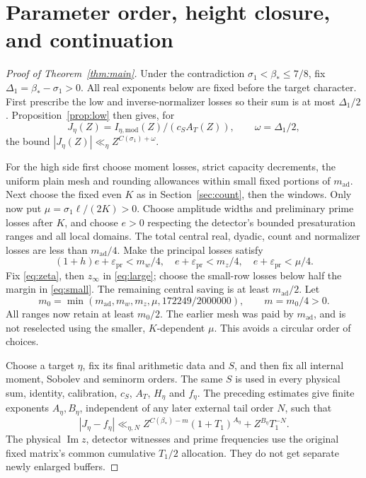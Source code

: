 \documentclass[11pt,a4paper]{article}
\theoremstyle{definition}
\newcommand{\Ima}{\operatorname{Im}}
\newcommand{\eps}{\varepsilon}
\newcommand{\sig}{\sigma_1}
\newcommand{\bet}{\beta_*}
\begin{document}
\section{Parameter order, height closure, and continuation}
\label{sec:closure}
\begin{proof}[Proof of Theorem~\ref{thm:main}]
Under the contradiction $\sig<\bet\le7/8$, fix
$\Delta_1=\bet-\sig>0$.
All real exponents below are fixed before the target character.
First prescribe the low and inverse-normalizer losses so their sum
is at most $\Delta_1/2$. Proposition~\ref{prop:low} then gives, for
\[
 J_\eta(Z)=I_{\eta,\mathrm{mod}}(Z)/(c_S A_T(Z)),
 \qquad \omega=\Delta_1/2,
\]
the bound $|J_\eta(Z)|\ll_\eta Z^{C(\sig)+\omega}$.

For the high side first choose moment losses, strict capacity
decrements, the uniform plain mesh and rounding allowances within
small fixed portions of $m_{\mathrm{ad}}$. Next choose the fixed
even $K$ as in Section~\ref{sec:count}, then the windows. Only now put
$\mu=\sig\ell/(2K)>0$. Choose amplitude widths and preliminary
prime losses after $K$, and choose $e>0$ respecting the detector's
bounded presaturation ranges and all local domains.
The total central real, dyadic, count and normalizer losses are
less than $m_{\mathrm{ad}}/4$.
Make the principal losses satisfy
\[
 (1+h)e+\eps_{\mathrm{pr}}<m_w/4,\quad
 e+\eps_{\mathrm{pr}}<m_z/4,\quad
 e+\eps_{\mathrm{pr}}<\mu/4.
\]
Fix \eqref{eq:zeta}, then $z_\infty$ in \eqref{eq:large};
choose the small-row losses below half the margin in \eqref{eq:small}.
The remaining central saving is at least $m_{\mathrm{ad}}/2$.
Let
\[
 m_0=\min(m_{\mathrm{ad}},m_w,m_z,\mu,172249/2000000),
 \qquad m=m_0/4>0.
\]
All ranges now retain at least $m_0/2$. The earlier mesh was paid
by $m_{\mathrm{ad}}$, and is not reselected using the smaller,
$K$-dependent $\mu$. This avoids a circular order of choices.

Choose a target $\eta$, fix its final arithmetic data and $S$,
and then fix all internal moment, Sobolev and seminorm orders.
The same $S$ is used in every physical sum, identity, calibration,
$c_S$, $A_T$, $H_\eta$ and $f_\eta$.
The preceding estimates give finite exponents $A_\eta,B_\eta$,
independent of any later external tail order $N$, such that
\begin{equation}\label{eq:highestimate}
 |J_\eta-f_\eta|
 \ll_{\eta,N} Z^{C(\bet)-m}(1+T_1)^{A_\eta}
                  +Z^{B_\eta}T_1^{-N}.
\end{equation}
The physical $\Ima z$, detector witnesses and prime frequencies use
the original fixed matrix's common cumulative $T_1/2$ allocation.
They do not get separate newly enlarged buffers.


\end{proof}
\end{document}
